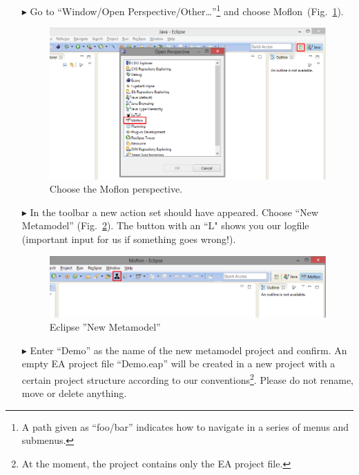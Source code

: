\begin{enumerate}
\item[$\blacktriangleright$] Go to ``Window/Open Perspective/Other\ldots''\footnote{A path given as ``foo/bar'' indicates how to navigate in a series of menus and submenus.} and choose Moflon~(Fig.~\ref{fig_eclipse}). 
\begin{figure}[htbp]
	\centering
  \includegraphics[width=\textwidth]{pics/installationAndSetup/eclipse_firststart.png}
	\caption{Choose the Moflon perspective.}
	\label{fig_eclipse}
\end{figure}

\item[$\blacktriangleright$] In the toolbar a new action set should have appeared. Choose ``New Metamodel'' (Fig.~\ref{fig_eclipseNewMetamodel}).
The button with an ``L" shows you our logfile (important input for us if something goes wrong!).
\begin{figure}[htbp]
	\centering
  \includegraphics[width=\textwidth]{pics/installationAndSetup/eclipse_metamodelButton.png}
	\caption{Eclipse ''New Metamodel''}
	\label{fig_eclipseNewMetamodel}
\end{figure}

\item[$\blacktriangleright$] Enter ``Demo'' as the name of the new metamodel project and confirm. 
An empty EA project file ``Demo.eap'' will be created in a new project with a certain project structure according to our conventions\footnote{At the moment, the project contains only the EA project file.}.
Please do not rename, move or delete anything.


\end{enumerate}
